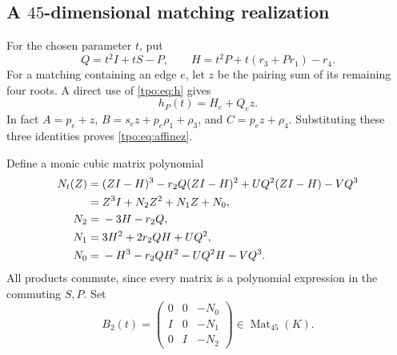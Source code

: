 \documentclass[11pt,letterpaper]{article}
\numberwithin{equation}{section}
\theoremstyle{definition}
\theoremstyle{remark}
\begin{document}
\subsection{A $45$-dimensional matching realization}
For the chosen parameter $t$, put
\begin{equation}
 Q=t^2I+tS-P,\qquad
 H=t^2P+t(r_3+Pr_1)-r_4.
 \label{tpo:eq:QH}
\end{equation}
For a matching containing an edge $e$, let $z$ be the pairing sum of its
remaining four roots. A direct use of \eqref{tpo:eq:h} gives
\begin{equation}
 h_P(t)=H_e+Q_e z.
 \label{tpo:eq:affinez}
\end{equation}
In fact $A=p_e+z$, $B=s_ez+p_e\rho_1+\rho_3$, and $C=p_ez+\rho_4$.
Substituting these three identities proves \eqref{tpo:eq:affinez}.

Define a monic cubic matrix polynomial
\begin{align}
 N_t(Z)={}&(ZI-H)^3-r_2Q(ZI-H)^2+UQ^2(ZI-H)-VQ^3\notag\\
        ={}&Z^3I+N_2Z^2+N_1Z+N_0,
 \label{tpo:eq:N}\\
 N_2={}&-3H-r_2Q,\notag\\
 N_1={}&3H^2+2r_2QH+UQ^2,\notag\\
 N_0={}&-H^3-r_2QH^2-UQ^2H-VQ^3.\notag
\end{align}
All products commute, since every matrix is a polynomial expression in the
commuting $S,P$. Set
\begin{equation}
 B_2(t)=
 \begin{pmatrix}
 0&0&-N_0\\ I&0&-N_1\\0&I&-N_2
 \end{pmatrix}\in\operatorname{Mat}_{45}(K).
 \label{tpo:eq:B2}
\end{equation}
\end{document}
